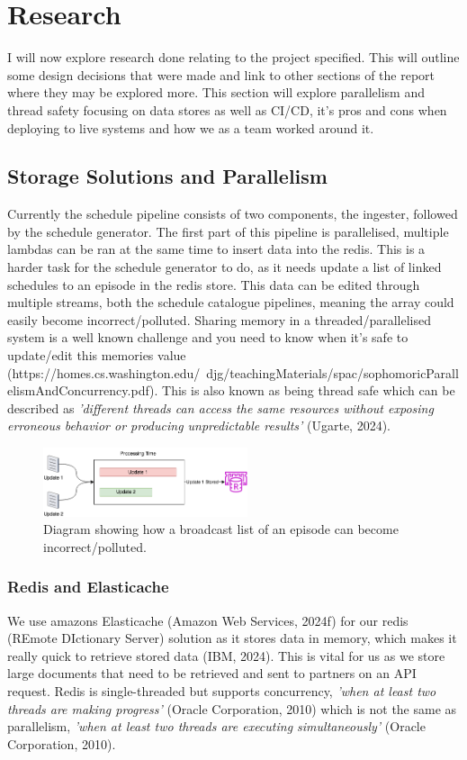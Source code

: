 \section{Research}
  I will now explore research done relating to the project specified. This will outline some design decisions that were made and link to other 
  sections of the report where they may be explored more. This section will explore parallelism and thread safety focusing on data stores as well as 
  CI/CD, it's pros and cons when deploying to live systems and how we as a team worked around it.

  \subsection{Storage Solutions and Parallelism}
  \label{sec:storageSolutions}

  Currently the schedule pipeline consists of two components, the ingester, followed by the schedule generator. The first part of this pipeline is
  parallelised, multiple lambdas can be ran at the same time to insert data into the redis. This is a harder task for the schedule generator to do,
  as it needs update a list of linked schedules to an episode in the redis store. This data can be edited through multiple streams, both the schedule
  catalogue pipelines, meaning the array could easily become incorrect/polluted. Sharing memory in a threaded/parallelised system is a well known 
  challenge and you need to know when it's safe to update/edit this memories value (https://homes.cs.washington.edu/~djg/teachingMaterials/spac/sophomoricParallelismAndConcurrency.pdf).
  This is also known as being thread safe which can be described as \textit{'different threads can access the same resources without exposing erroneous 
  behavior or producing unpredictable results'} (Ugarte, 2024).

  \begin{figure}[H]
    \centering
    \includegraphics[width=6cm]{assets/raceCondition.drawio.png}
    \caption{Diagram showing how a broadcast list of an episode can become incorrect/polluted.}
    \label{fig:raceCondition}
  \end{figure}

  \subsubsection{Redis and Elasticache}
  We use amazons Elasticache (Amazon Web Services, 2024f) for our redis (REmote DIctionary Server) solution as it stores data in memory, which makes it 
  really quick to retrieve stored data (IBM, 2024). This is vital for us as we store large documents that need to be retrieved and sent to partners on 
  an API request. Redis is single-threaded but supports concurrency, \textit{'when at least two threads are making progress'} (Oracle Corporation, 2010) 
  which is not the same as parallelism, \textit{'when at least two threads are executing simultaneously'} (Oracle Corporation, 2010).

